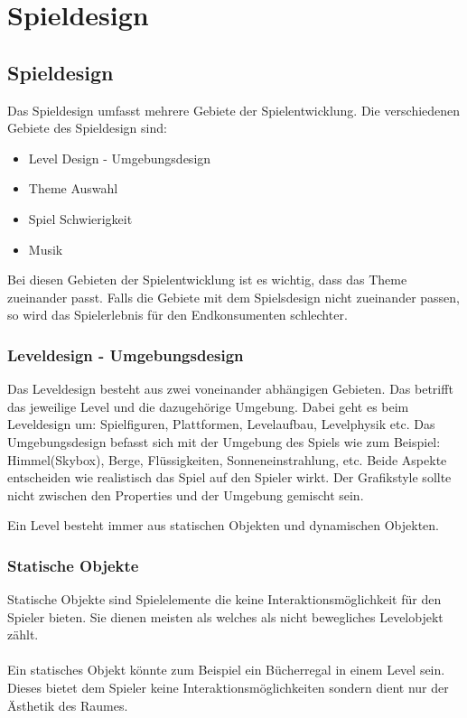 \pagebreak
{}
\chapter{Spieldesign}
\section{Spieldesign} %


Das Spieldesign umfasst mehrere Gebiete der Spielentwicklung. Die verschiedenen Gebiete des Spieldesign sind:

\begin{itemize} %
    \item Level Design - Umgebungsdesign 
    \item Theme Auswahl 
    \item Spiel Schwierigkeit 
    \item Musik
\end{itemize}

Bei diesen Gebieten der Spielentwicklung ist es wichtig, dass das Theme zueinander passt. Falls die Gebiete mit dem Spielsdesign nicht zueinander passen, so wird das Spielerlebnis für den Endkonsumenten schlechter. 

\subsection{Leveldesign - Umgebungsdesign}
Das Leveldesign besteht aus zwei voneinander abhängigen Gebieten. 
Das betrifft das jeweilige Level und die dazugehörige Umgebung. Dabei geht es beim Leveldesign um: Spielfiguren, Plattformen, Levelaufbau, Levelphysik etc. 
Das Umgebungsdesign befasst sich mit der Umgebung des Spiels wie zum Beispiel: Himmel(Skybox), Berge, Flüssigkeiten, Sonneneinstrahlung, etc. 
Beide Aspekte entscheiden wie realistisch das Spiel auf den Spieler wirkt. Der Grafikstyle sollte nicht zwischen den Properties und der Umgebung gemischt sein.

Ein Level besteht immer aus statischen Objekten und dynamischen Objekten. 

\pagebreak

\subsection{Statische Objekte}
Statische Objekte sind Spielelemente die keine Interaktionsmöglichkeit für den Spieler bieten. Sie dienen meisten als  welches als nicht bewegliches Levelobjekt zählt. \\\\
Ein statisches Objekt könnte zum Beispiel ein Bücherregal in einem Level sein. Dieses bietet dem Spieler keine Interaktionsmöglichkeiten sondern dient nur der Ästhetik des Raumes. \\

